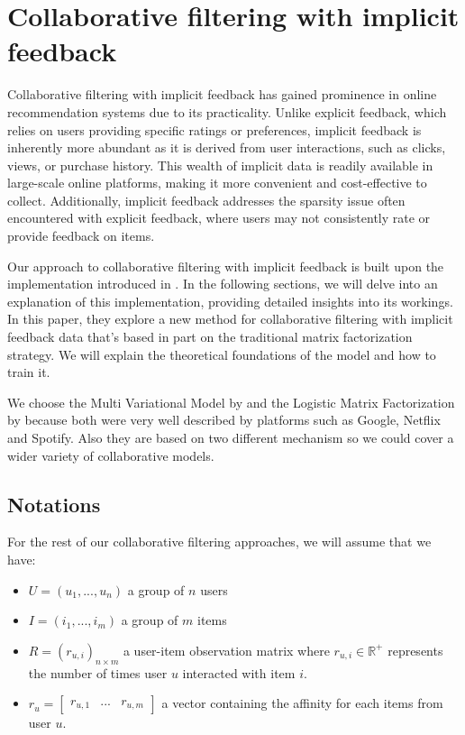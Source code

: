 \chapter{Collaborative filtering with implicit feedback}
Collaborative filtering with implicit feedback has gained prominence in online recommendation systems due to its practicality. Unlike explicit feedback, which relies on users providing specific ratings or preferences, implicit feedback is inherently more abundant as it is derived from user interactions, such as clicks, views, or purchase history. This wealth of implicit data is readily available in large-scale online platforms, making it more convenient and cost-effective to collect. Additionally, implicit feedback addresses the sparsity issue often encountered with explicit feedback, where users may not consistently rate or provide feedback on items.

Our approach to collaborative filtering with implicit feedback is built upon the implementation introduced in \cite{johnson_logistic_matrix_factorization}. In the following sections, we will delve into an explanation of this implementation, providing detailed insights into its workings. In this paper, they explore a new method for collaborative filtering with implicit feedback
data that’s based in part on the traditional matrix factorization strategy. We will explain the theoretical foundations of the model and how to train it.

We choose the Multi Variational Model by \cite{liang2018variational} and the Logistic Matrix Factorization by \cite{johnson_logistic_matrix_factorization} because both were very well described by platforms such as Google, Netflix and Spotify. Also they are based on two different mechanism so we could cover a wider variety of collaborative models.

\section{Notations}
For the rest of our collaborative filtering approaches, we will assume that we have:
\begin{itemize}
    \item $U = \left( u_1, ..., u_n \right)$ a group of $n$ users
    \item $I = \left( i_1, ..., i_m \right)$ a group of $m$ items
    \item $R = \left( r_{u,i} \right)_{n \times m}$ a user-item observation matrix where $r_{u,i} \in \mathbb{R}^+$ represents the number of times user $u$ interacted with item $i$.
    \item $r_u = \begin{bmatrix} r_{u,1} & ... & r_{u,m} \end{bmatrix}$ a vector containing the affinity for each items from user $u$.
\end{itemize}

